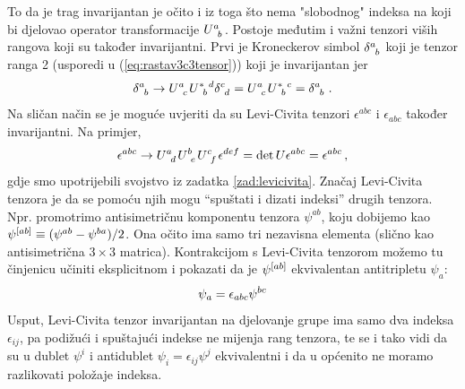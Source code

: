 To da je trag invarijantan je očito i iz toga što nema
"slobodnog" indeksa na koji bi djelovao operator transformacije
$\tensor{U}{^{a}_{b}}$. Postoje međutim i važni tenzori
viših rangova koji su također invarijantni.
Prvi je Kroneckerov simbol $\tensor{\delta}{^a_b}$ koji je  
tenzor ranga 2 (usporedi u (\ref{eq:rastav3c3tensor})) koji je invarijantan jer
\begin{equation*}
\tensor{\delta}{^a_b} \to  \tensor{U}{^a_c}
\tensor{U}{^*_b^d} \tensor{\delta}{^c_d} = 
\tensor{U}{^a_c} \tensor{U}{^*_b^c} = \tensor{\delta}{^a_b} \;.
\end{equation*}
Na sličan način se je moguće uvjeriti da su Levi-Civita
tenzori $\epsilon^{abc}$  i $\epsilon_{abc}$ 
također invarijantni.
Na primjer, 
\begin{equation}
    \epsilon^{abc} \to     
     \tensor{U}{^a_d}
     \tensor{U}{^b_e}
     \tensor{U}{^c_f}\epsilon^{def} 
     = \det U \epsilon^{abc} = \epsilon^{abc} \,,
\end{equation}
gdje smo upotrijebili svojstvo iz zadatka \ref{zad:levicivita}.
Značaj Levi-Civita tenzora je da se pomoću
njih mogu ``spuštati i dizati indeksi'' drugih tenzora.
Npr. promotrimo antisimetričnu komponentu tenzora $\psi^{ab}$,
koju dobijemo kao $\tensor{\psi}{^{[ab]}} \equiv (\psi^{ab}-\psi^{ba})/2$.
Ona očito ima samo tri nezavisna elementa (slično kao
antisimetrična $3\times 3$ matrica). Kontrakcijom s 
Levi-Civita tenzorom možemo tu činjenicu učiniti eksplicitnom
i pokazati da je $\tensor{\psi}{^{[ab]}}$ ekvivalentan
antitripletu $\psi_a$:
\begin{equation}
  \psi_a = \epsilon_{abc} \tensor{\psi}{^{bc}}
\label{eq:spustanjeindeksa}
\end{equation}
Usput, Levi-Civita tenzor invarijantan na 
djelovanje  grupe ima samo
dva indeksa $\epsilon_{ij}$, pa podižući i spuštajući
indekse ne mijenja rang tenzora, te se i tako vidi
da su u  dublet $\psi^{i}$ i antidublet
$\psi_{i} = \epsilon_{ij}\psi^{j}$ ekvivalentni i da
u  općenito ne moramo razlikovati položaje indeksa.

